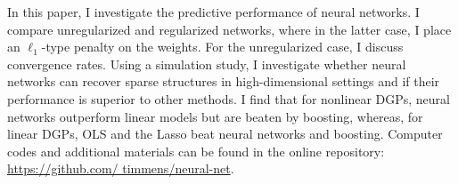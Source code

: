 In this paper, I investigate the predictive performance of neural networks. I compare
unregularized and regularized networks, where in the latter case, I place an
$\ell_1$-type penalty on the weights. For the unregularized case, I discuss convergence
rates. Using a simulation study, I investigate whether neural networks can recover
sparse structures in high-dimensional settings and if their performance is superior to
other methods. I find that for nonlinear DGPs, neural networks outperform linear models
but are beaten by boosting, whereas, for linear DGPs, OLS and the Lasso beat neural
networks and boosting. Computer codes and additional materials can be found in the
online repository: \url{https://github.com/ timmens/neural-net}.
